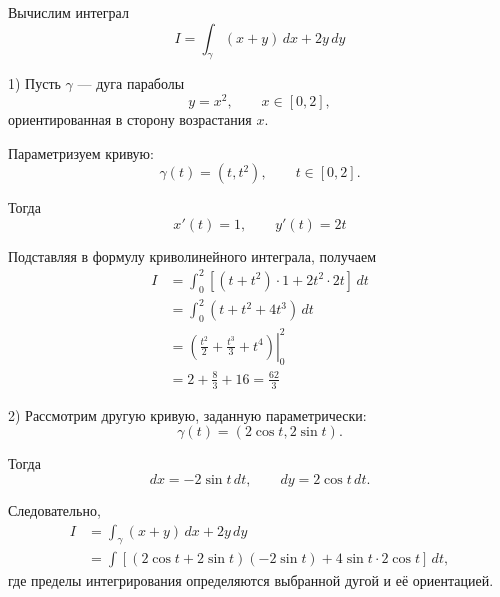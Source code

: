 \documentclass[12pt,a4paper]{article}
\begin{document}
\begin{example}
Вычислим интеграл
\[
I=\int_\gamma (x+y)\,dx+2y\,dy
\]

1) Пусть $\gamma$ — дуга параболы
\[
y=x^2,\qquad x\in[0,2],
\]
ориентированная в сторону возрастания $x$.

Параметризуем кривую:
\[
\gamma(t)=(t,t^2),
\qquad t\in[0,2].
\]

Тогда
\[
x'(t)=1,\qquad y'(t)=2t
\]

Подставляя в формулу криволинейного интеграла, получаем
\[
\begin{aligned}
I
&=
\int_0^2
\left[
(t+t^2)\cdot1
+
2t^2\cdot2t
\right]\,dt
\\
&=
\int_0^2
(t+t^2+4t^3)\,dt
\\
&=
\left.
\left(
\frac{t^2}{2}
+
\frac{t^3}{3}
+
t^4
\right)
\right|_0^2
\\
&=
2+\frac83+16
=
\frac{62}{3}
\end{aligned}
\]

2) Рассмотрим другую кривую, заданную параметрически:
\[
\gamma(t)=
(2\cos t,2\sin t).
\]

Тогда
\[
dx=-2\sin t\,dt,
\qquad
dy=2\cos t\,dt.
\]

Следовательно,
\[
\begin{aligned}
I
&=
\int_\gamma (x+y)\,dx+2y\,dy
\\
&=
\int
\left[
(2\cos t+2\sin t)(-2\sin t)
+
4\sin t\cdot2\cos t
\right]\,dt,
\end{aligned}
\]
где пределы интегрирования определяются выбранной дугой и её ориентацией.

\end{example}

\newpage
\end{document}
